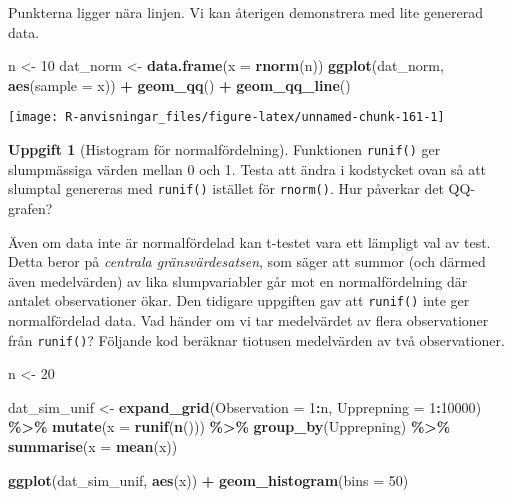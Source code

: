 \documentclass[
]{book}
\newenvironment{Shaded}{\begin{snugshade}}{\end{snugshade}}
\newcommand{\AttributeTok}[1]{\textcolor[rgb]{0.13,0.29,0.53}{#1}}
\newcommand{\DecValTok}[1]{\textcolor[rgb]{0.00,0.00,0.81}{#1}}
\newcommand{\FunctionTok}[1]{\textcolor[rgb]{0.13,0.29,0.53}{\textbf{#1}}}
\newcommand{\NormalTok}[1]{#1}
\newcommand{\OtherTok}[1]{\textcolor[rgb]{0.56,0.35,0.01}{#1}}
\newcommand{\SpecialCharTok}[1]{\textcolor[rgb]{0.81,0.36,0.00}{\textbf{#1}}}
\theoremstyle{definition}
\theoremstyle{definition}
\theoremstyle{definition}
\newtheorem{exercise}{Uppgift}[chapter]
\theoremstyle{definition}
\theoremstyle{remark}
\begin{document}
Punkterna ligger nära linjen. Vi kan återigen demonstrera med lite genererad data.

\begin{Shaded}
\begin{Highlighting}[]
\NormalTok{n }\OtherTok{\textless{}{-}} \DecValTok{10}
\NormalTok{dat\_norm }\OtherTok{\textless{}{-}} \FunctionTok{data.frame}\NormalTok{(}\AttributeTok{x =} \FunctionTok{rnorm}\NormalTok{(n))}
\FunctionTok{ggplot}\NormalTok{(dat\_norm, }\FunctionTok{aes}\NormalTok{(}\AttributeTok{sample =}\NormalTok{ x)) }\SpecialCharTok{+} \FunctionTok{geom\_qq}\NormalTok{() }\SpecialCharTok{+} \FunctionTok{geom\_qq\_line}\NormalTok{()}
\end{Highlighting}
\end{Shaded}

\begin{center}\texttt{[image: R-anvisningar\_files/figure-latex/unnamed-chunk-161-1]} \end{center}

\begin{exercise}[Histogram för normalfördelning]
Funktionen \texttt{runif()} ger slumpmässiga värden mellan 0 och 1. Testa att ändra i kodstycket ovan så att slumptal genereras med \texttt{runif()} istället för \texttt{rnorm()}. Hur påverkar det QQ-grafen?
\end{exercise}

Även om data inte är normalfördelad kan t-testet vara ett lämpligt val av test. Detta beror på \emph{centrala gränsvärdesatsen}, som säger att summor (och därmed även medelvärden) av lika slumpvariabler går mot en normalfördelning där antalet observationer ökar. Den tidigare uppgiften gav att \texttt{runif()} inte ger normalfördelad data. Vad händer om vi tar medelvärdet av flera observationer från \texttt{runif()}? Följande kod beräknar tiotusen medelvärden av två observationer.

\begin{Shaded}
\begin{Highlighting}[]
\NormalTok{n }\OtherTok{\textless{}{-}} \DecValTok{20}

\NormalTok{dat\_sim\_unif }\OtherTok{\textless{}{-}} \FunctionTok{expand\_grid}\NormalTok{(}\AttributeTok{Observation =} \DecValTok{1}\SpecialCharTok{:}\NormalTok{n, }\AttributeTok{Upprepning =} \DecValTok{1}\SpecialCharTok{:}\DecValTok{10000}\NormalTok{) }\SpecialCharTok{\%\textgreater{}\%} 
  \FunctionTok{mutate}\NormalTok{(}\AttributeTok{x =} \FunctionTok{runif}\NormalTok{(}\FunctionTok{n}\NormalTok{())) }\SpecialCharTok{\%\textgreater{}\%} 
  \FunctionTok{group\_by}\NormalTok{(Upprepning) }\SpecialCharTok{\%\textgreater{}\%} 
  \FunctionTok{summarise}\NormalTok{(}\AttributeTok{x =} \FunctionTok{mean}\NormalTok{(x))}

\FunctionTok{ggplot}\NormalTok{(dat\_sim\_unif, }\FunctionTok{aes}\NormalTok{(x)) }\SpecialCharTok{+} \FunctionTok{geom\_histogram}\NormalTok{(}\AttributeTok{bins =} \DecValTok{50}\NormalTok{)}
\end{Highlighting}
\end{Shaded}
\end{document}

